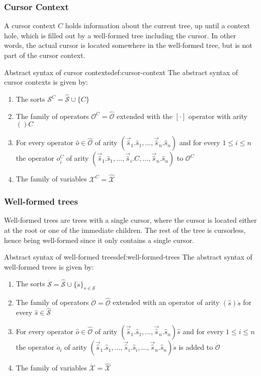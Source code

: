 \subsubsection{Cursor Context}
\label{subsubsec:cursor-context}
A cursor context $C$ holds information about the current tree, up until
a context hole, which is filled out by a well-formed tree including the cursor. 
In other words, the actual cursor is located somewhere in the well-formed tree, 
but is not part of the cursor context.

\begin{definition}{Abstract syntax of cursor contexts}{def:cursor-context}
The abstract syntax of cursor contexts is given by:
\begin{enumerate}
    \item The sorts $\mathcal{S}^C = \hat{\mathcal{S}} \cup \{C\}$
    \item The family of operators $\mathcal{O}^C = \hat{\mathcal{O}}$ extended with the $[\cdot]$ operator with arity $()C$
    \item For every operator $\hat{o} \in \hat{\mathcal{O}}$ of arity $(\vec{\hat{s}}_1.\hat{s}_1,...,\vec{\hat{s}}_n.\hat{s}_n)$ and for every $1 \leq i \leq n$ the operator $o_i^C$ of arity $(\vec{\hat{s}}_1.\hat{s}_1,...,\vec{\hat{s}}_i.C,...,\vec{\hat{s}}_n.\hat{s}_n)$ to $\mathcal{O}^C$
    \item The family of variables $\mathcal{X}^C = \hat{\mathcal{X}}$
\end{enumerate}
\end{definition}

\subsubsection{Well-formed trees}
\label{subsubsec:well-formed-trees}
Well-formed trees are trees with a single cursor, where the cursor is located either
at the root or one of the immediate children. The rest of the tree is cursorless,
hence being well-formed since it only contains a single cursor.

\begin{definition}{Abstract syntax of well-formed trees}{def:well-formed-trees}
The abstract syntax of well-formed trees is given by:
\begin{enumerate}
    \item The sorts $\dot{\mathcal{S}} = \hat{\mathcal{S}} \cup \{ \dot{s} \}_{s \in \mathcal{S}}$
    \item The family of operators $\dot{\mathcal{O}} = \hat{\mathcal{O}}$ extended with an operator of arity $(\hat{s})\dot{s}$ for every $\hat{s} \in \hat{\mathcal{S}}$
    \item For every operator $\hat{o} \in \hat{\mathcal{O}}$ of arity $(\vec{\hat{s}}_1.\hat{s}_1,...,\vec{\hat{s}}_n.\hat{s}_n)\hat{s}$ and for every $1 \leq i \leq n$ the operator $\dot{o}_i$ of arity $(\vec{\hat{s}}_1.\hat{s}_1,...,\vec{\hat{s}}_i.\hat{s}_i,...,\vec{\hat{s}}_n.\hat{s}_n)\dot{s}$ is added to $\dot{\mathcal{O}}$
    \item The family of variables $\dot{\mathcal{X}} = \hat{\mathcal{X}}$
\end{enumerate}
\end{definition}

